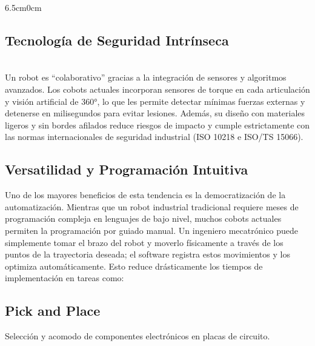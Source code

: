\documentclass[10pt,twoside]{article}
\begin{document}
\begin{adjustwidth}{6.5cm}{0cm}
\subsection*{Tecnología de Seguridad Intrínseca}\\

Un robot es “colaborativo” gracias a la integración de sensores y algoritmos avanzados. Los cobots actuales incorporan sensores de torque en cada articulación y visión artificial de 360°, lo que les permite detectar mínimas fuerzas externas y detenerse en milisegundos para evitar lesiones. Además, su diseño con materiales ligeros y sin bordes afilados reduce riesgos de impacto y cumple estrictamente con las normas internacionales de seguridad industrial (ISO 10218 e ISO/TS 15066).

\subsection*{Versatilidad y Programación Intuitiva}
Uno de los mayores beneficios de esta tendencia es la democratización de la automatización. Mientras que un robot industrial tradicional requiere meses de programación compleja en lenguajes de bajo nivel, muchos cobots actuales permiten la programación por guiado manual. Un ingeniero mecatrónico puede simplemente tomar el brazo del robot y moverlo físicamente a través de los puntos de la trayectoria deseada; el software registra estos movimientos y los optimiza automáticamente. Esto reduce drásticamente los tiempos de implementación en tareas como:

\subsection*{Pick and Place} Selección y acomodo de componentes electrónicos en placas de circuito.


\end{adjustwidth}
\end{document}
